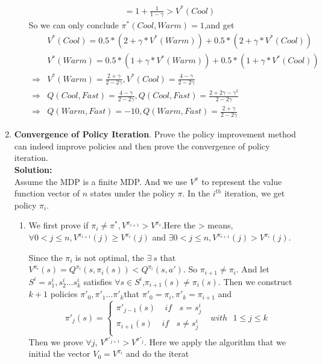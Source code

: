\documentclass{article}
\begin{document}
\begin{enumerate}
\begin{enumerate}
\begin{equation}
\begin{aligned}
            &=1+\frac{1}{1-\gamma}>V^*(Cool)
            \end{aligned}
        \end{equation}
        So we can only conclude $\pi^*(Cool,Warm)=1$,and get
        \begin{equation}
            \begin{aligned}
            &V^*(Cool)=0.5*(2+\gamma*V^*(Warm))+0.5*(2+\gamma*V^*(Cool))\\
            &V^*(Warm)=0.5*(1+\gamma*V^*(Warm))+0.5*(1+\gamma*V^*(Cool))\\
            \Rightarrow& V^*(Warm)=\frac{2+\gamma}{2-2\gamma},V^*(Cool)=\frac{4-\gamma}{2-2\gamma}\\
            \Rightarrow&Q(Cool,Fast)=\frac{4-\gamma}{2-2\gamma},Q(Cool,Fast)=\frac{2+2\gamma-\gamma^2}{2-2\gamma}\\
            \Rightarrow&Q(Warm,Fast)=-10,Q(Warm,Fast)=\frac{2+\gamma}{2-2\gamma}
            \end{aligned}
        \end{equation}
    \end{enumerate}
    \item \textbf{Convergence of Policy Iteration}.
	Prove the policy improvement method can indeed improve policies and then prove the convergence of policy iteration.\\
	\textbf{Solution:}\\
	Assume the MDP is a finite MDP. And we use $V^{\pi}$ to represent the value function vector of $n$ states under the policy $\pi$. In the $i^{th}$ iteration, we get policy $\pi_i$.
	\begin{enumerate}
	    \item We first prove if $\pi_i\neq \pi^*,V^{\pi_{i+1}}>V^{\pi_{i}}$.Here the > means,$\forall 0<j\le n ,V^{\pi_{i+1}}(j)\ge V^{\pi_{i}}(j)$ and $\exists 0<j\le n ,V^{\pi_{i+1}}(j)> V^{\pi_{i}}(j)$.\\
	    \par Since the $\pi_i$ is not optimal, the $\exists~s$ that $V^{\pi_i}(s)=Q^{\pi_i}(s,\pi_i(s))<Q^{\pi_i}(s,a')$. So $\pi_{i+1}\neq \pi_i$. And let $S^i={s^i_1,s^i_2\dots s^i_k}$ satisfies $\forall s\in S^i$,$\pi_{i+1}(s)\neq \pi_{i}(s)$. Then we construct $k+1$ policies $\pi'_0,\pi'_1\dots \pi'_k$that $\pi'_0=\pi_i,\pi'_k=\pi_{i+1}$ and
	    \begin{equation}
	        \pi'_j(s)=\left\{
\begin{aligned}
\pi'_{j-1}(s)~~~~~if~~~~s=s^i_j \\
\pi_{i+1}(s)~~~~~if~~~~s\neq s^i_j\\
\end{aligned}
\right.~~~with~~~1\le j\le k
	    \end{equation}
	    Then we prove $\forall j$, $V^{\pi'_{j+1}}>V^{\pi'_{j}}$. Here we apply the algorithm that we initial the vector $V_0=V^{\pi_{i}}$ and do the iterat
	\end{enumerate}
	
\end{enumerate}
\end{document}
